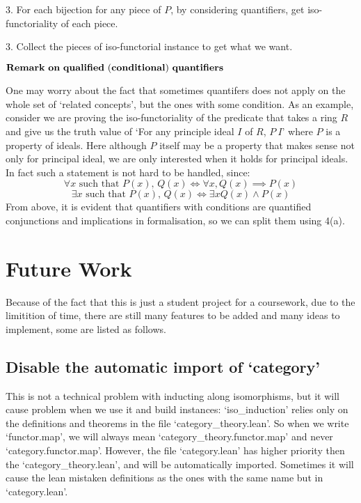 \documentclass[11pt]{article}
\begin{document}
3. For each bijection for any piece of $P$, by considering quantifiers, get iso-functoriality of each piece.

3. Collect the pieces of iso-functorial instance to get what we want.


$\bf Remark \ on \ qualified \ (conditional)\ quantifiers$

One may worry about the fact that sometimes quantifers does not apply on the whole set of `related concepts', but the ones with some condition. As an example, consider we are proving the iso-functoriality of the predicate that takes a ring $R$ and give us the truth value of `For any principle ideal $I$ of $R$, $P \ I$' where $P$ is a property of ideals. Here although $P$ itself may be a property that makes sense not only for principal ideal, we are only interested when it holds for principal ideals. In fact such a statement is not hard to be handled, since: 
\[\text{$\forall x$ such that $P(x)$, $Q(x)$} \Leftrightarrow
\text{$\forall x,Q(x)\implies P(x)$}\]
\[\text{$\exists x$ such that $P(x)$, $Q(x)$} \Leftrightarrow
\text{$\exists x Q(x)\land P(x)$}\]
From above, it is evident that quantifiers with conditions are quantified conjunctions and implications in formalisation, so we can split them using 4(a).


\section{Future Work}

Because of the fact that this is just a student project for a coursework, due to the limitition of time, there are still many features to be added and many ideas to implement, some are listed as follows.

\subsection{Disable the automatic import of `category'}

This is not a technical problem with inducting along isomorphisms, but it will cause problem when we use it and build instances: `iso\_induction' relies only on the definitions and theorems in the file `category\_theory.lean'. So when we write `functor.map', we will always mean `category\_theory.functor.map' and never `category.functor.map'. However, the file `category.lean' has higher priority then the `category\_theory.lean', and will be automatically imported. Sometimes it will cause the lean mistaken definitions as the ones with the same name but in `category.lean'.
\end{document}
